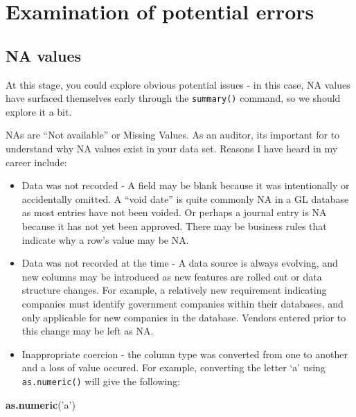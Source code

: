 \documentclass[
]{book}
\newenvironment{Shaded}{\begin{snugshade}}{\end{snugshade}}
\newcommand{\KeywordTok}[1]{\textcolor[rgb]{0.13,0.29,0.53}{\textbf{#1}}}
\newcommand{\NormalTok}[1]{#1}
\newcommand{\StringTok}[1]{\textcolor[rgb]{0.31,0.60,0.02}{#1}}
\begin{document}
\hypertarget{examination-of-potential-errors}{%
\section{Examination of potential errors}\label{examination-of-potential-errors}}

\hypertarget{completeness-na}{%
\subsection{NA values}\label{completeness-na}}

At this stage, you could explore obvious potential issues - in this case, NA values have surfaced themselves early through the \texttt{summary()} command, so we should explore it a bit.

NAs are ``Not available'' or Missing Values. As an auditor, its important for to understand why NA values exist in your data set. Reasons I have heard in my career include:

\begin{itemize}
\item
  Data was not recorded - A field may be blank because it was intentionally or accidentally omitted. A ``void date'' is quite commonly NA in a GL database as most entries have not been voided. Or perhaps a journal entry is NA because it has not yet been approved. There may be business rules that indicate why a row's value may be NA.
\item
  Data was not recorded at the time - A data source is always evolving, and new columns may be introduced as new features are rolled out or data structure changes. For example, a relatively new requirement indicating companies must identify government companies within their databases, and only applicable for new companies in the database. Vendors entered prior to this change may be left as NA.
\item
  Inappropriate coercion - the column type was converted from one to another and a loss of value occured. For example, converting the letter `a' using \texttt{as.numeric()} will give the following:
\end{itemize}

\begin{Shaded}
\begin{Highlighting}[]
\KeywordTok{as.numeric}\NormalTok{(}\StringTok{'a'}\NormalTok{)}
\end{Highlighting}
\end{Shaded}
\end{document}
